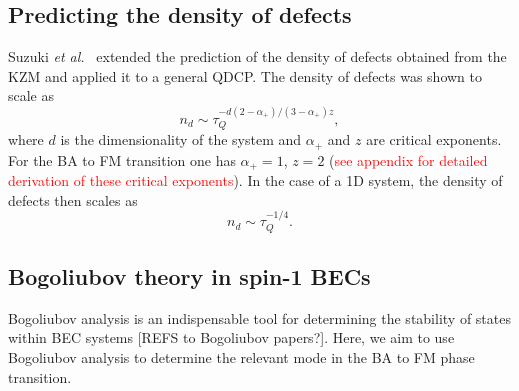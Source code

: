 \subsection{Predicting the density of defects}
Suzuki \textit{et al.}~\cite{Suzuki2015} extended the prediction of the density
of defects obtained from the KZM and applied it to a general QDCP\@.
The density of defects was shown to scale as
\begin{equation}
    n_d \sim \tau_Q^{-d(2-\alpha_+)/(3-\alpha_+)z},
\end{equation}
where \( d \) is the dimensionality of the system and \( \alpha_+ \) and
\(  z \) are critical exponents.
For the BA to FM transition one has \( \alpha_+=1 \), \( z=2 \)
(\textcolor{red}{see appendix for detailed derivation of these critical
exponents}).
In the case of a 1D system, the density of defects then scales as
\begin{equation}
    n_d \sim \tau_Q^{-1/4}.
\end{equation}


\subsection{Bogoliubov theory in spin-1 BECs}
Bogoliubov analysis is an indispensable tool for determining the stability of
states within BEC systems [REFS to Bogoliubov papers?].
Here, we aim to use Bogoliubov analysis to determine the relevant mode in the
BA to FM phase transition.

